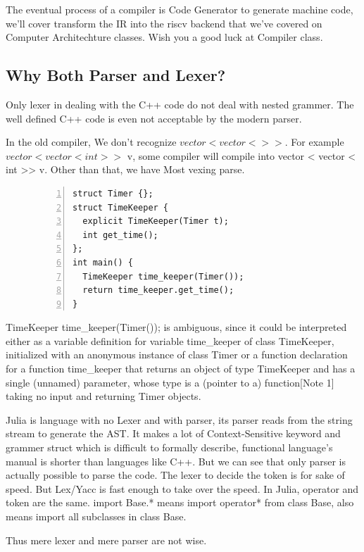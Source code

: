 \documentclass[a4paper]{article}
\theoremstyle{definition}
\begin{document}
The eventual process of a compiler is Code Generator to generate machine code, we'll cover transform the IR into the riscv backend that we've covered on Computer Architechture classes. Wish you a good luck at Compiler class.

\subsection{Why Both Parser and Lexer?}
Only lexer in dealing with the C++ code do not deal with nested grammer. The well defined C++ code is even not acceptable by the modern parser.

In the old compiler, We don't recognize $vector<vector<> >$. For example $vector<vector<int> >$ v, some compiler will compile into vector < vector < int >> v. Other than that, we have Most vexing parse.

\begin{figure}[H]
    \begin{lstlisting}[language={[ANSI]C},
            numbers=left,
            numberstyle=\extratiny,
            basicstyle=\small]
struct Timer {};
struct TimeKeeper {
  explicit TimeKeeper(Timer t);
  int get_time();
};
int main() {
  TimeKeeper time_keeper(Timer());
  return time_keeper.get_time();
}
    \end{lstlisting}
\end{figure}

TimeKeeper time\_keeper(Timer()); is ambiguous, since it could be interpreted either as a variable definition for variable time\_keeper of class TimeKeeper, initialized with an anonymous instance of class Timer or a function declaration for a function time\_keeper that returns an object of type TimeKeeper and has a single (unnamed) parameter, whose type is a (pointer to a) function[Note 1] taking no input and returning Timer objects.

Julia is language with no Lexer and with parser, its parser reads from the string stream to generate the AST. It makes a lot of Context-Sensitive keyword and grammer struct which is difficult to formally describe, functional language's manual is shorter than languages like C++. But we can see that only parser is actually possible to parse the code. The lexer to decide the token is for sake of speed. But Lex/Yacc is fast enough to take over the speed. In Julia, operator and token are the same. import Base.* means import operator* from class Base, also means import all subclasses in class Base.

Thus mere lexer and mere parser are not wise.
\end{document}
